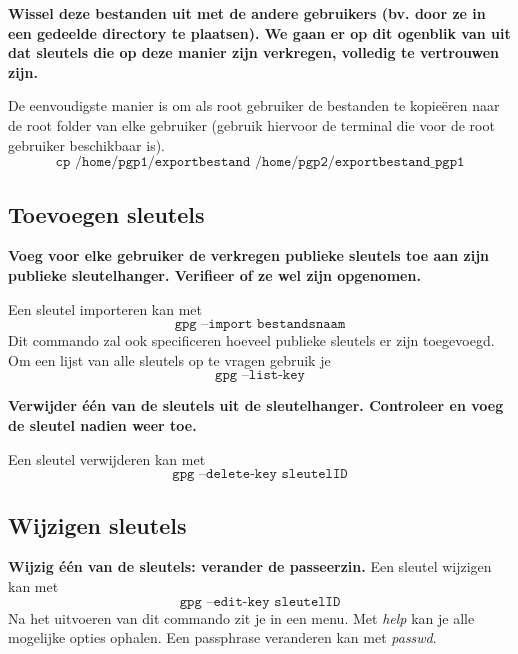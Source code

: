 \documentclass{report}
\begin{document}
\begin{itemize}
\textbf{Wissel deze bestanden uit met de andere gebruikers (bv. door ze in een gedeelde directory te plaatsen). We gaan er op dit ogenblik van uit dat sleutels die op deze manier zijn verkregen, volledig te vertrouwen zijn.} 

De eenvoudigste manier is om als root gebruiker de bestanden te kopieëren naar de root folder van elke gebruiker (gebruik hiervoor de terminal die voor de root gebruiker beschikbaar is).
$$\texttt{cp /home/pgp1/exportbestand /home/pgp2/exportbestand\_pgp1}$$
\end{itemize}

\subsection{Toevoegen sleutels}
\textbf{Voeg voor elke gebruiker de verkregen publieke sleutels toe aan zijn publieke sleutelhanger. Verifieer of ze wel zijn opgenomen.}

Een sleutel importeren kan met 
$$\texttt{gpg --import bestandsnaam}$$
Dit commando zal ook specificeren hoeveel publieke sleutels er zijn toegevoegd. Om een lijst van alle sleutels op te vragen gebruik je
$$\texttt{gpg --list-key}$$

\textbf{Verwijder één van de sleutels uit de sleutelhanger. Controleer en voeg de sleutel nadien weer toe.}

Een sleutel verwijderen kan met 
$$\texttt{gpg --delete-key sleutelID}$$

\subsection{Wijzigen sleutels}
\textbf{Wijzig één van de sleutels: verander de passeerzin.}
Een sleutel wijzigen kan met
$$\texttt{gpg --edit-key sleutelID}$$
Na het uitvoeren van dit commando zit je in een menu. Met \textit{help} kan je alle mogelijke opties ophalen. Een passphrase veranderen kan met \textit{passwd}.
\end{document}
